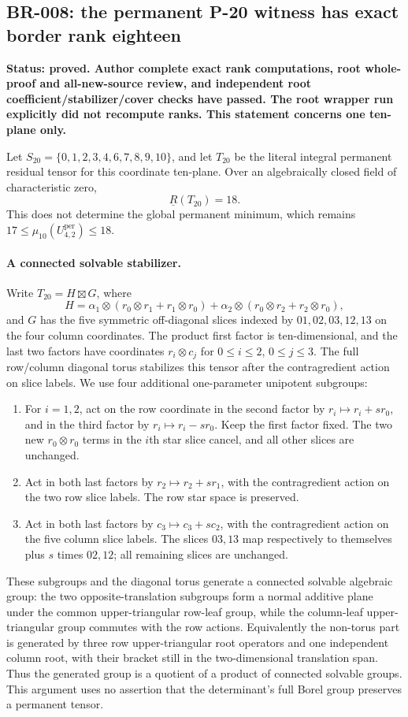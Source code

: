 \subsection*{BR-008: the permanent P-20 witness has exact border rank eighteen}
\textbf{Status: proved.  Author complete exact rank computations, root whole-proof
and all-new-source review, and independent root coefficient/stabilizer/cover
checks have passed.  The root wrapper run explicitly did not recompute ranks.
This statement concerns one ten-plane only.}

Let $S_{20}=\{0,1,2,3,4,6,7,8,9,10\}$, and let $T_{20}$ be the
literal integral permanent residual tensor for this coordinate ten-plane.
Over an algebraically closed field of characteristic zero,
\[
 \underline R(T_{20})=18.
\]
This does not determine the global permanent minimum, which remains
$17\le\mu_{10}(U^{\mathrm{per}}_{4,2})\le18$.

\paragraph{A connected solvable stabilizer.}
Write $T_{20}=H\boxtimes G$, where
\[
 H=\alpha_1\otimes(r_0\otimes r_1+r_1\otimes r_0)
  +\alpha_2\otimes(r_0\otimes r_2+r_2\otimes r_0),
\]
and $G$ has the five symmetric off-diagonal slices indexed by
$01,02,03,12,13$ on the four column coordinates.  The product first
factor is ten-dimensional, and the last two factors have coordinates
$r_i\otimes c_j$ for $0\le i\le2$, $0\le j\le3$.
The full row/column diagonal torus stabilizes this tensor after the
contragredient action on slice labels.  We use four additional
one-parameter unipotent subgroups:
\begin{enumerate}
\item For $i=1,2$, act on the row coordinate in the second factor by
$r_i\mapsto r_i+s r_0$, and in the third factor by
$r_i\mapsto r_i-s r_0$.  Keep the first factor fixed.  The two new
$r_0\otimes r_0$ terms in the $i$th star slice cancel, and all other
slices are unchanged.
\item Act in both last factors by $r_2\mapsto r_2+s r_1$, with the
contragredient action on the two row slice labels.  The row star
space is preserved.
\item Act in both last factors by $c_3\mapsto c_3+s c_2$, with the
contragredient action on the five column slice labels.  The slices
$03,13$ map respectively to themselves plus $s$ times $02,12$;
all remaining slices are unchanged.
\end{enumerate}
These subgroups and the diagonal torus generate a connected solvable
algebraic group: the two opposite-translation subgroups form a
normal additive plane under the common upper-triangular row-leaf
group, while the column-leaf upper-triangular group commutes with
the row actions.  Equivalently the non-torus part is generated by
three row upper-triangular root operators and one independent
column root, with their bracket still in the two-dimensional
translation span.  Thus the generated group is a quotient of a
product of connected solvable groups.  This argument uses no
assertion that the determinant's full Borel group preserves a
permanent tensor.

